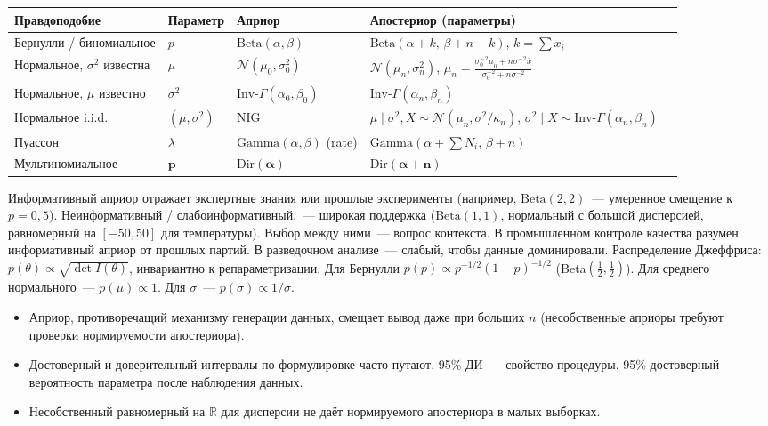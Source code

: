 \begin{center}
\footnotesize
\begin{tabular}{lllll}
\toprule
Правдоподобие & Параметр & Априор & Апостериор (параметры) \\
\midrule
Бернулли / биномиальное & $p$ & $\mathrm{Beta}(\alpha,\beta)$ &
$\mathrm{Beta}(\alpha{+}k,\,\beta{+}n{-}k)$, $k=\sum x_i$ \\
Нормальное, $\sigma^2$ известна & $\mu$ & $\mathcal{N}(\mu_0,\sigma_0^2)$ &
$\mathcal{N}(\mu_n,\sigma_n^2)$, $\mu_n=\frac{\sigma_0^{-2}\mu_0+n\sigma^{-2}\bar x}{\sigma_0^{-2}+n\sigma^{-2}}$ \\
Нормальное, $\mu$ известно & $\sigma^2$ & $\mathrm{Inv\text{-}}\Gamma(\alpha_0,\beta_0)$ &
$\mathrm{Inv\text{-}}\Gamma(\alpha_n,\beta_n)$ \\
Нормальное i.i.d. & $(\mu,\sigma^2)$ & NIG &
$\mu\mid\sigma^2,X\sim\mathcal{N}(\mu_n,\sigma^2/\kappa_n)$,
$\sigma^2\mid X\sim\mathrm{Inv\text{-}}\Gamma(\alpha_n,\beta_n)$ \\
Пуассон & $\lambda$ & $\mathrm{Gamma}(\alpha,\beta)$ (rate) &
$\mathrm{Gamma}(\alpha{+}{\sum N_i},\,\beta{+}n)$ \\
Мультиномиальное & $\mathbf{p}$ & $\mathrm{Dir}(\boldsymbol{\alpha})$ &
$\mathrm{Dir}(\boldsymbol{\alpha}+\mathbf{n})$ \\
\bottomrule
\end{tabular}
\end{center}

Информативный априор отражает экспертные знания или прошлые эксперименты (например, $\mathrm{Beta}(2,2)$~--- умеренное смещение к $p=0{,}5$).
Неинформативный / слабоинформативный.~--- широкая поддержка ($\mathrm{Beta}(1,1)$, нормальный с большой дисперсией, равномерный на $[-50,50]$ для температуры).
Выбор между ними~--- вопрос контекста. В промышленном контроле качества разумен информативный априор от прошлых партий. В разведочном анализе~--- слабый, чтобы данные доминировали.
Распределение Джеффриса: $p(\theta)\propto\sqrt{\det I(\theta)}$, инвариантно к репараметризации. Для Бернулли $p(p)\propto p^{-1/2}(1-p)^{-1/2}$ (Beta$(\tfrac12,\tfrac12)$). Для среднего нормального~--- $p(\mu)\propto 1$. Для $\sigma$~--- $p(\sigma)\propto 1/\sigma$.
\begin{itemize}
    \item Априор, противоречащий механизму генерации данных, смещает вывод
          даже при больших $n$ (несобственные априоры требуют проверки нормируемости апостериора).
    \item Достоверный и доверительный интервалы по формулировке
          часто путают. 95\% ДИ~--- свойство процедуры. 95\% достоверный~--- вероятность параметра после наблюдения данных.
    \item Несобственный равномерный на $\mathbb{R}$ для дисперсии не даёт нормируемого
          апостериора в малых выборках.
\end{itemize}

